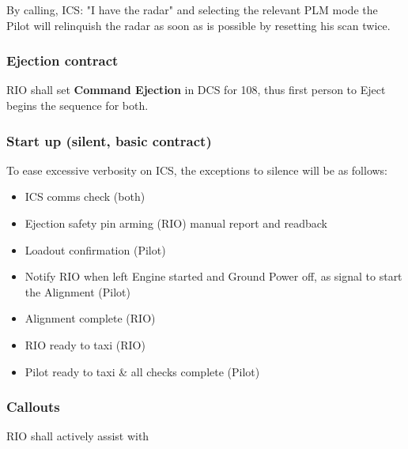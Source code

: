 By calling, ICS: "I have the radar" and selecting the relevant PLM mode the
Pilot will relinquish the radar as soon as is possible by resetting his scan
twice.

\subsubsection{Ejection contract}

RIO shall set \textbf{Command Ejection} in DCS for 108\th, thus first person to
Eject begins the sequence for both.

\subsubsection{Start up (silent, basic contract)}

To ease excessive verbosity on ICS, the exceptions to silence will be as
follows:

\begin{itemize}
  \item ICS comms check (both)

  \item Ejection safety pin arming (RIO) manual report and readback

  \item Loadout confirmation (Pilot)

  \item Notify RIO when left Engine started and Ground Power off, as signal to
    start the Alignment (Pilot)

  \item Alignment complete (RIO)

  \item RIO ready to taxi (RIO)

  \item Pilot ready to taxi \& all checks complete (Pilot)

\end{itemize}

\subsubsection{Callouts}

RIO shall actively assist with

